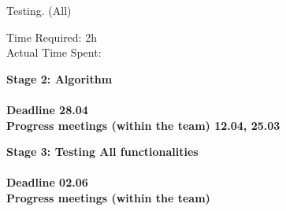 \documentclass{article}
\begin{document}
\begin{itemize}
\begin{itemize}
\begin{enumerate}
			
					{\bf \item Testing. (All) \\}
					Time Required: 2h \\ 
					Actual Time Spent: \\
										
			\end{enumerate}

	\end{itemize}

	\newpage

{\item \large \bf Stage 2: Algorithm \\ \\
	Deadline 28.04 \\
	Progress meetings (within the team) 12.04, 25.03 \\}


{\item \large \bf Stage 3: Testing All functionalities \\ \\
	Deadline 02.06 \\
	Progress meetings (within the team) \\}


\end{itemize}
\end{document}
